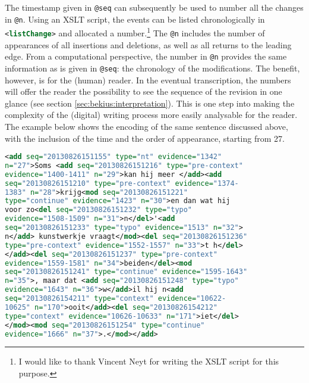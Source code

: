 \begin{paper}
The timestamp given in \lstinline[language=XML]!@seq! can subsequently be used to number all the
changes in \lstinline[language=XML]!@n!. Using an XSLT script, the events can be listed
chronologically in \lstinline[language=XML]!<listChange>! and allocated a
number.\footnote{I would like to thank Vincent Neyt for writing the XSLT
  script for this purpose.} The \lstinline[language=XML]!@n! includes the number of appearances of
all insertions and deletions, as well as all returns to the leading
edge. From a computational perspective, the number in \lstinline[language=XML]!@n! provides the
same information as is given in \lstinline[language=XML]!@seq!: the chronology of the
modifications. The benefit, however, is for the (human) reader. In the
eventual transcription, the numbers will offer the reader the
possibility to see the sequence of the revision in one glance (see
section \ref{sec:bekius:interpretation}). This is one step into making the complexity of the (digital)
writing process more easily analysable for the reader. The example below
shows the encoding of the same sentence discussed above, with the
inclusion of the time and the order of appearance, starting from 27.


\begin{example}
\label{ex:bekius:3}
\begin{lstlisting}[language=XML]
<add seq="20130826151155" type="nt" evidence="1342" 
n="27">Soms <add seq="20130826151216" type="pre-context"
evidence="1400-1411" n="29">kan hij meer </add><add 
seq="20130826151210" type="pre-context" evidence="1374-
1383" n="28">krijg<mod seq="20130826151221" 
type="continue" evidence="1423" n="30">en dan wat hij 
voor zo<del seq="20130826151232" type="typo" 
evidence="1508-1509" n="31">n</del>'<add 
seq="20130826151233" type="typo" evidence="1513" n="32">
n</add> kunstwerkje vraagt</mod><del seq="20130826151236"
type="pre-context" evidence="1552-1557" n="33">t h</del>
</add><del seq="20130826151237" type="pre-context" 
evidence="1559-1581" n="34">beiden</del><mod 
seq="20130826151241" type="continue" evidence="1595-1643" 
n="35">, maar dat <add seq="20130826151248" type="typo" 
evidence="1643" n="36">w</add>il hij n<add 
seq="20130826154211" type="context" evidence="10622-
10625" n="170">ooit</add><del seq="20130826154212" 
type="context" evidence="10626-10633" n="171">iet</del>
</mod><mod seq="20130826151254" type="continue" 
evidence="1666" n="37">.</mod></add>
\end{lstlisting}
\end{example}


\end{paper}
